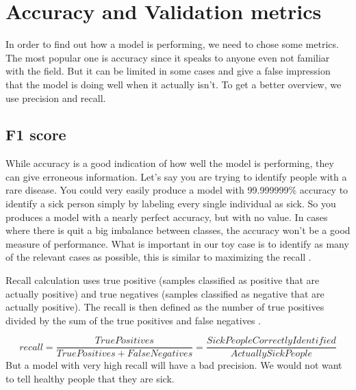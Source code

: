 \section{Accuracy and Validation metrics}
In order to find out how a model is performing, we need to chose some metrics. The most popular one is accuracy since it speaks to anyone even not familiar with the field. But it can be limited in some cases and give a false impression that the model is doing well when it actually isn't. To get a better overview, we use precision and recall. 

\subsection{F1 score}
While accuracy is a good indication of how well the model is performing, they can give erroneous information. Let's say you are trying to identify people with a rare disease. You could very easily produce a model with 99.999999\% accuracy to identify a sick person simply by labeling every single individual as sick. So you produces a model with a nearly perfect accuracy, but with no value. In cases where there is quit a big imbalance between classes, the accuracy won't be a good measure of performance.
What is important in our toy case is to identify as many of the relevant cases as possible, this is similar to maximizing the recall \cite{multimetrics}. 

Recall calculation uses true positive (samples classified as positive that are actually positive) and true negatives (samples classified as negative that are actually positive). The recall is then defined as the number of true positives divided by the sum of the true positives and false negatives \cite{metrics}. 


\[recall = \frac{True Positives}{True Positives + False Negatives} = \frac{Sick People Correctly Identified}{Actually Sick People}\]
But a model with very high recall will have a bad precision. We would not want to tell healthy people that they are sick. 

